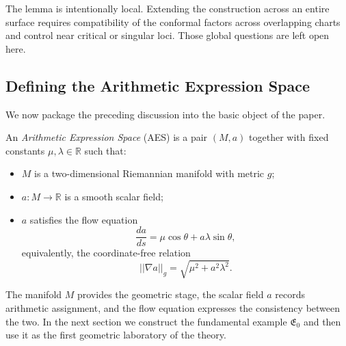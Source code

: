 The lemma is intentionally local. Extending the construction across an entire surface requires compatibility of the conformal factors across overlapping charts and control near critical or singular loci. Those global questions are left open here.

\subsection{Defining the Arithmetic Expression Space}\label{subsec:aes-definition}

We now package the preceding discussion into the basic object of the paper.

\begin{definition}\label{def:aes}
An \emph{Arithmetic Expression Space} (AES) is a pair $(M,a)$ together with fixed constants $\mu,\lambda\in\mathbb{R}$ such that:
\begin{itemize}
    \item $M$ is a two-dimensional Riemannian manifold with metric $g$;
    \item $a:M\to\mathbb{R}$ is a smooth scalar field;
    \item $a$ satisfies the flow equation
    \[
        \frac{da}{ds} = \mu \cos \theta + a \lambda \sin \theta,
    \]
    equivalently, the coordinate-free relation
    \[
        ||\nabla a||_g = \sqrt{\mu^2 + a^2 \lambda^2}.
    \]
\end{itemize}
The manifold $M$ provides the geometric stage, the scalar field $a$ records arithmetic assignment, and the flow equation expresses the consistency between the two. In the next section we construct the fundamental example $\mathfrak{E}_0$ and then use it as the first geometric laboratory of the theory.
\end{definition}
